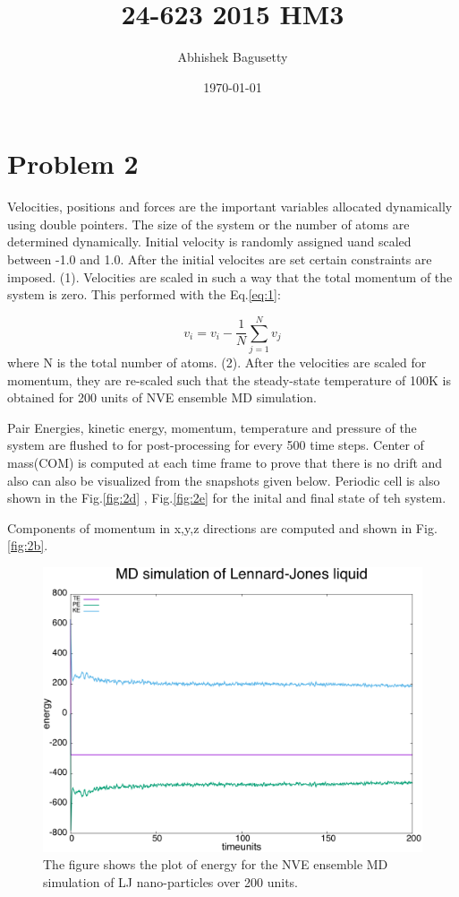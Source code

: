 \documentclass{article}
\author{Abhishek Bagusetty}
\date{\today}
\title{24-623 2015 HM3}
\begin{document}
\maketitle

\section{Problem 2}
\label{sec-1}
Velocities, positions and forces are the important variables allocated dynamically using double pointers. The size of the system or the number of atoms are determined dynamically. Initial velocity is randomly assigned uand scaled between -1.0 and 1.0. After the initial velocites are set certain constraints are imposed. (1). Velocities are scaled in such a way that the total momentum of the system is zero. This performed with the Eq.\ref{eq:1}:

\begin{equation}
v_{i} = v_{i} - \frac{1}{N}\sum_{j=1}^{N}v_{j} \label{eq:1}
\end{equation}
where N is the total number of atoms.
(2). After the velocities are scaled for momentum, they are re-scaled such that the steady-state temperature of 100K is obtained for 200 units of NVE ensemble MD simulation.

Pair Energies, kinetic energy, momentum, temperature and pressure of the system are flushed to for post-processing for every 500 time steps. Center of mass(COM) is computed at each time frame to prove that there is no drift and also can also be visualized from the snapshots given below.
Periodic cell is also shown in the Fig.\ref{fig:2d} , Fig.\ref{fig:2e} for the inital and final state of teh system.

Components of momentum in x,y,z directions are computed and shown in Fig.\ref{fig:2b}. 


\begin{figure}[htb]
\centering
\includegraphics[width=.9\linewidth]{./P2/LDmj_sim_ener.png}
\caption{\label{fig:2a}The figure shows the plot of energy for the NVE ensemble MD simulation of LJ nano-particles over 200 units.}
\end{figure}
\end{document}
